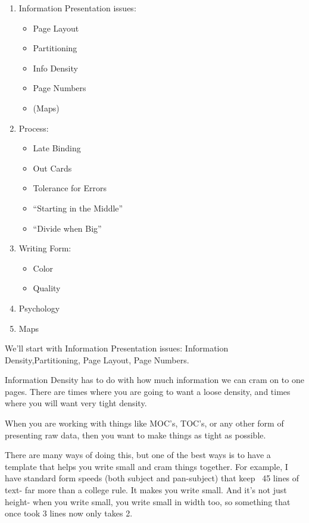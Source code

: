 \documentclass[oneside]{book}
\begin{document}
\begin{enumerate}
\item Information Presentation issues:
   \begin {itemize}
   \item Page Layout
   \item Partitioning
   \item Info Density
   \item Page Numbers
   \item (Maps)
   \end {itemize}

\item Process:
   \begin {itemize}
   \item Late Binding
   \item Out Cards
   \item Tolerance for Errors
   \item ``Starting in the Middle''
   \item ``Divide when Big''
   \end {itemize}

\item Writing Form:
   \begin {itemize}
   \item Color
   \item Quality
   \end {itemize}

\item Psychology

\item Maps
\end{enumerate}

We'll start with Information Presentation issues:
Information Density,Partitioning, Page Layout, Page Numbers.

Information Density has to do with how much information we can cram on
to one pages. There are times where you are going to want a loose
density, and times where you will want very tight density.

When you are working with things like MOC's, TOC's, or any other
form of presenting raw data, then you want to make things as tight
as possible.

There are many ways of doing this, but one of the best ways is to have
a template that helps you write small and cram things together. For
example, I have standard form speeds (both subject and pan-subject)
that keep ~45 lines of text- far more than a college rule. It makes
you write small. And it's not just height- when you write small, you
write small in width too, so something that once took 3 lines now only
takes 2.
\end{document}
